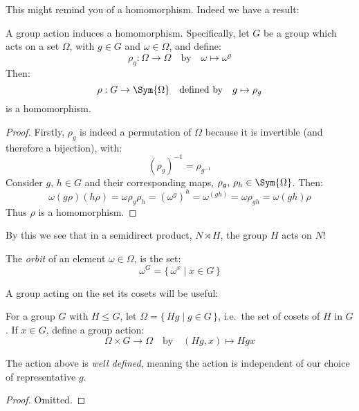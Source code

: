 This might remind you of a homomorphism.
Indeed we have a result:

\begin{lemma}\label{lem:actionhom}
    \raggedright
    A group action induces a homomorphism.
    Specifically, let \(G\) be a group which acts on a set \(\Omega\), with \(g \in G\) and \(\omega \in \Omega\), and
    define:
    \[\rho_g:\Omega \to \Omega \quad \text{by} \quad \omega \mapsto \omega^g\]
    Then:
    \[\rho:G \to \Sym{\Omega} \quad \text{defined by} \quad g \mapsto \rho_g\]
    is a homomorphism.
\end{lemma}

\begin{proof}
    Firstly, \(\rho_g\) is indeed a permutation of \(\Omega\) because it is invertible (and therefore a bijection),
    with:
    \[{(\rho_g)}^{-1} = \rho_{g^{-1}}\]
    Consider \(g,\,h \in G\) and their corresponding maps, \(\rho_{g},\,\rho_{h} \in \Sym{\Omega}\).
    Then:
    \[\omega(g\rho)(h\rho) = \omega\rho_g\rho_h = {(\omega^g)}^h = \omega^{(gh)} = \omega\rho_{gh} = \omega(gh)\rho\]
    Thus \(\rho\) is a homomorphism.
\end{proof}

By this we see that in a semidirect product, \(N \rtimes H\), the group \(H\) acts on \(N\)!

\begin{definition}
    \raggedright
    The \emph{orbit} of an element \(\omega \in \Omega\), is the set:
    \[\omega^G = \{\,\omega^x \mid x \in G\,\}\]
\end{definition}

A group acting on the set its cosets will be useful:

\begin{definition}
    \raggedright
    For a group \(G\) with \(H \leqslant G\), let \(\Omega = \{\,Hg \mid g \in G\,\}\), i.e.\ the set of cosets of \(H\)
    in \(G\).
    If \(x \in G\), define a group action:
    \[\Omega \times G \to \Omega \quad \text{by} \quad (Hg, x) \mapsto Hgx\]
\end{definition}

\begin{lemma}
    \raggedright
    The action above is \emph{well defined}, meaning the action is independent of our choice of representative \(g\).
\end{lemma}

\begin{proof}
    Omitted.
\end{proof}

